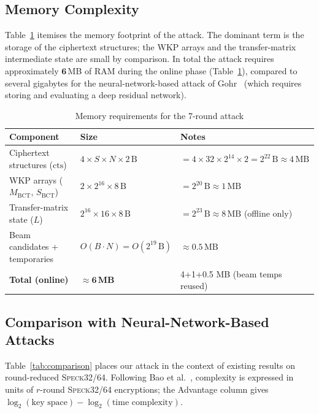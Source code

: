 \documentclass[runningheads]{llncs}
\newcommand{\speck}{\textsc{Speck}32/64}
\begin{document}
\subsection{Memory Complexity}

Table~\ref{tab:memory} itemises the memory footprint of the attack.
The dominant term is the storage of the ciphertext structures; the
WKP arrays and the transfer-matrix intermediate state are small by
comparison.  In total the attack requires approximately $\mathbf{6}$\,MB
of RAM during the online phase (Table~\ref{tab:memory}), compared to
several gigabytes for the neural-network-based attack of
Gohr~\cite{Goh19} (which requires storing and evaluating a deep residual
network).

\begin{table}[h]
\centering
\caption{Memory requirements for the 7-round attack}
\label{tab:memory}
\begin{tabular}{lll}
\toprule
\textbf{Component} & \textbf{Size} & \textbf{Notes} \\
\midrule
Ciphertext structures ($\mathrm{cts}$)
  & $4 \times S \times N \times 2\,\mathrm{B}$
  & $= 4 \times 32 \times 2^{14} \times 2 = 2^{22}\,\mathrm{B} \approx 4\,\mathrm{MB}$ \\
WKP arrays ($M_{\mathrm{BCT}},\,S_{\mathrm{BCT}}$)
  & $2 \times 2^{16} \times 8\,\mathrm{B}$
  & $= 2^{20}\,\mathrm{B} \approx 1\,\mathrm{MB}$ \\
Transfer-matrix state ($L$)
  & $2^{16} \times 16 \times 8\,\mathrm{B}$
  & $= 2^{23}\,\mathrm{B} \approx 8\,\mathrm{MB}$ (offline only) \\
Beam candidates + temporaries
  & $O(B \cdot N) = O(2^{19}\,\mathrm{B})$
  & $\approx 0.5\,\mathrm{MB}$ \\
\midrule
\textbf{Total (online)}
  & $\mathbf{\approx 6\,\text{MB}}$ & 4+1+0.5 MB (beam temps reused) \\
\bottomrule
\end{tabular}
\end{table}

\subsection{Comparison with Neural-Network-Based Attacks}

Table~\ref{tab:comparison} places our attack in the context of existing
results on round-reduced \speck{}.
Following Bao et al.~\cite{BLY23}, complexity is expressed in units of
$r$-round \speck{} encryptions; the Advantage column gives
$\log_2(\text{key space}) - \log_2(\text{time complexity})$.
\end{document}
